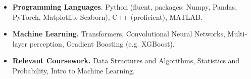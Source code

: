 

\begin{cvparagraph}

\begin{itemize}[leftmargin=*, noitemsep]
    \item \textbf{Programming Languages}. Python (fluent, packages: Numpy, Pandas, PyTorch, Matplotlib, Seaborn), C++ (proficient), MATLAB.
    \item \textbf{Machine Learning.} Transformers, Convolutional Neural Networks, Multi-layer perception, Gradient Boosting (e.g. XGBoost). 
    \item \textbf{Relevant Coursework.} Data Structures and Algorithms, Statistics and Probability, Intro to Machine Learning. 
\end{itemize}

\end{cvparagraph}
